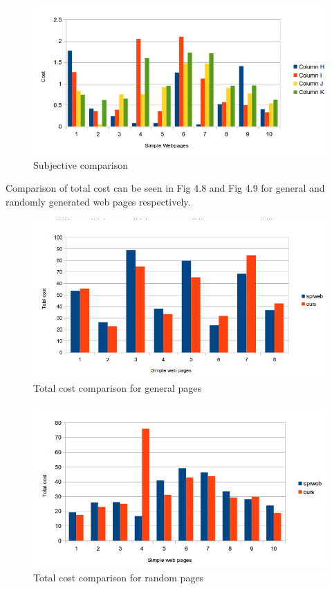 \begin{figure}[!htb]
  \centering
  \includegraphics[width=\linewidth]{simpleRS.png}
\caption{Subjective comparison}
\label{fig:test}
\end{figure}

Comparison of total cost can be seen in Fig 4.8 and Fig 4.9 for general and randomly generated web pages respectively. 


\begin{figure}[!htb]
\centering
  \includegraphics[width=\linewidth]{simpleGtotal.png}
  \caption{Total cost comparison for general pages}
  \label{fig:sub1}
\end{figure}

\begin{figure}[!htb]
  \centering
  \includegraphics[width=\linewidth]{simpleRtotal.png}
\caption{Total cost comparison for random pages}
\label{fig:test}
\end{figure}


